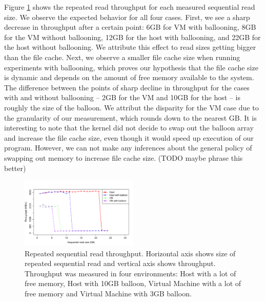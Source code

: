 Figure \ref{fig:p3graph} shows the repeated read throughput for each measured sequential read size. We observe the expected behavior for all four cases. First, we see a sharp decrease in throughput after a certain point: 6GB for VM with ballooning, 8GB for the VM without ballooning, 12GB for the host with ballooning, and 22GB for the host without ballooning. We attribute this effect to read sizes getting bigger than the file cache. Next, we observe a smaller file cache size when running experiments with ballooning, which proves our hypothesis that the file cache size is dynamic and depends on the amount of free memory available to the system. The difference between the points of sharp decline in throughput for the cases with and without ballooning -- 2GB for the VM and 10GB for the host -- is roughly the size of the balloon. We attribut the disparity for the VM case due to the granularity of our measurement, which rounds down to the nearest GB. It is interesting to note that the kernel did not decide to swap out the balloon array and increase the file cache size, even though it would speed up execution of our program. However, we can not make any inferences about the general policy of swapping out memory to increase file cache size. (TODO maybe phrase this better)

\begin{figure}[t!]
	\includegraphics[width=0.5\textwidth]{./figures/p3.pdf}
	\caption{Repeated sequential read throughput. Horizontal axis shows size of repeated sequential read and vertical axis shows throughput. Throughput was measured in four environments: Host with a lot of free memory, Host with 10GB balloon, Virtual Machine with a lot of free memory and Virtual Machine with 3GB balloon.}
	\label{fig:p3graph}
\end{figure}
